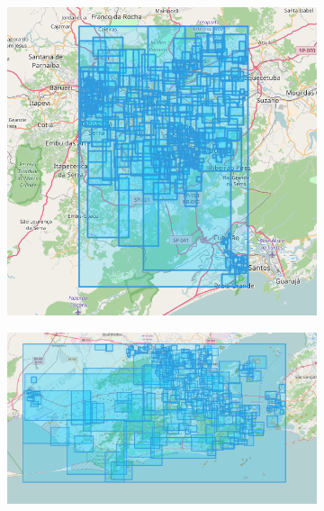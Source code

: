 \begin{figure}[!htbp]
	\centering
	\begin{subfigure}[htbp]{0.4\textwidth}
		\centering
		\includegraphics[width=1\linewidth]{figures/sp_bbs.png}
		\caption{}
		\label{subfig:saopaulo_bounding_boxes}
	\end{subfigure}
	\quad
	\begin{subfigure}[htbp]{0.5\textwidth}
		\centering
		\includegraphics[width=1\linewidth]{figures/rio_bbs.png}
		\caption{}
		\label{subfig:riodejaneiro_bounding_boxes}
	\end{subfigure}
	
	\medskip
	

\end{figure}
